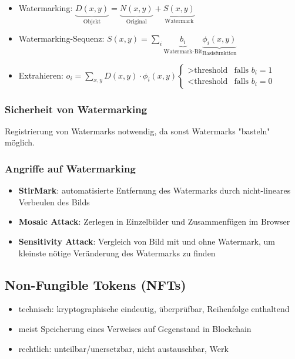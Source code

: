 \documentclass{article}
\begin{document}
\begin{itemize}
  \item Watermarking: $\underbrace{D(x,y)}_{\text{Objekt}} = \underbrace{N(x,y)}_{\text{Original}} + \underbrace{S(x,y)}_{\text{Watermark}}$
  \item Watermarking-Sequenz: $S(x,y) = \sum_{i}{\underbrace{b_i}_{\text{Watermark-Bit}} \underbrace{\phi_i(x,y)}_{\text{Basisfunktion}}}$
  \item Extrahieren: $o_i = \sum_{x,y}{D(x,y) \cdot \phi_i(x,y)} \begin{cases} > \text{threshold} & \text{falls } b_i = 1 \\ < \text{threshold} & \text{falls } b_i = 0 \end{cases}$
\end{itemize}

\subsubsection{Sicherheit von Watermarking}
Registrierung von Watermarks notwendig, da sonst Watermarks "basteln" möglich.

\subsubsection{Angriffe auf Watermarking}
\begin{itemize}
  \item \textbf{StirMark}: automatisierte Entfernung des Watermarks durch nicht-lineares Verbeulen des Bilds
  \item \textbf{Mosaic Attack}: Zerlegen in Einzelbilder und Zusammenfügen im Browser
  \item \textbf{Sensitivity Attack}: Vergleich von Bild mit und ohne Watermark, um kleinste nötige Veränderung des Watermarks zu finden
\end{itemize}

\subsection{Non-Fungible Tokens (NFTs)}
\begin{itemize}
  \item technisch: kryptographische eindeutig, überprüfbar, Reihenfolge enthaltend
  \item meist Speicherung eines Verweises auf Gegenstand in Blockchain
  \item rechtlich: unteilbar/unersetzbar, nicht austauschbar, Werk
\end{itemize}
\end{document}
